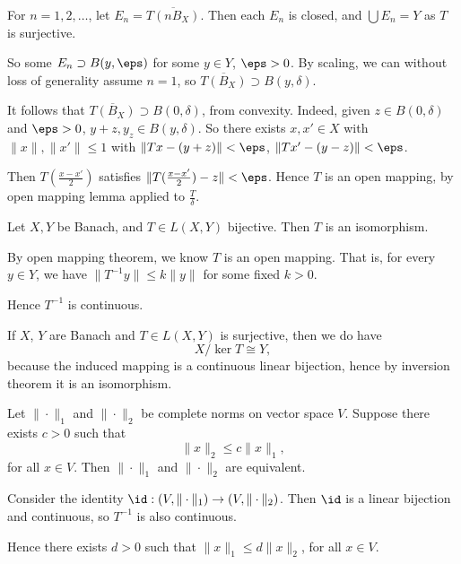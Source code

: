 \documentclass[12pt]{article}
\begin{document}
\begin{proofbox}
	For $n = 1, 2, \ldots$, let $E_n = \overline{T(nB_X)}$. Then each $E_n$ is closed, and $\bigcup E_n = Y$ as $T$ is surjective.

	So some $E_n \supset B(y, \eps)$ for some $y \in Y$, $\eps > 0$. By scaling, we can without loss of generality assume $n = 1$, so $\overline{T(B_X)} \supset B(y, \delta)$.

	It follows that $\overline{T(B_X)} \supset B(0, \delta)$, from convexity. Indeed, given $z \in B(0, \delta)$ and $\eps > 0$, $y + z, y_z \in B(y, \delta)$. So there exists $x, x' \in X$ with $\|x\|, \|x'\| \leq 1$ with $\|Tx - (y+z)\| < \eps$, $\|Tx' - (y-z)\| < \eps$.

	Then $T(\frac{x-x'}{2})$ satisfies $\|T(\frac{x-x'}{2})-z\| < \eps$. Hence $T$ is an open mapping, by open mapping lemma applied to $\frac{T}{\delta}$.
\end{proofbox}

\begin{corollary}
	Let $X, Y$ be Banach, and $T \in L(X,Y)$ bijective. Then $T$ is an isomorphism.
\end{corollary}

\begin{proofbox}
	By open mapping theorem, we know $T$ is an open mapping. That is, for every $y \in Y$, we have $\|T^{-1}y\|\leq k\|y\|$ for some fixed $k > 0$.

	Hence $T^{-1}$ is continuous.
\end{proofbox}

\begin{remark}
	If $X$, $Y$ are Banach and $T \in L(X,Y)$ is surjective, then we do have
	\[
	X/\ker T \cong Y,
	\]
	because the induced mapping is a continuous linear bijection, hence by inversion theorem it is an isomorphism.
\end{remark}

\begin{corollary}
	Let $\|\cdot\|_1$ and $\|\cdot\|_2$ be complete norms on vector space $V$. Suppose there exists $c > 0$ such that
	\[
	\|x\|_2 \leq c\|x\|_1,
	\]
	for all $x \in V$. Then $\|\cdot\|_1$ and $\|\cdot\|_2$ are equivalent.
\end{corollary}

\begin{proofbox}
	Consider the identity $\id : (V,\|\cdot\|_1) \to (V,\|\cdot\|_2)$. Then $\id$ is a linear bijection and continuous, so $T^{-1}$ is also continuous.

	Hence there exists $d > 0$ such that $\|x\|_1 \leq d\|x\|_2$, for all $x \in V$.
\end{proofbox}
\end{document}
